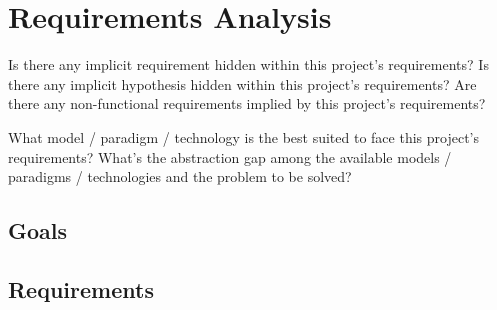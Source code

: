 \section{Requirements Analysis}

Is there any implicit requirement hidden within this project's requirements?
%
Is there any implicit hypothesis hidden within this project's requirements?
%
Are there any non-functional requirements implied by this project's requirements?

What model / paradigm / technology is the best suited to face this project's requirements?
%
What's the abstraction gap among the available models / paradigms / technologies and the problem to be solved?

\subsection{Goals}

\subsection{Requirements}

